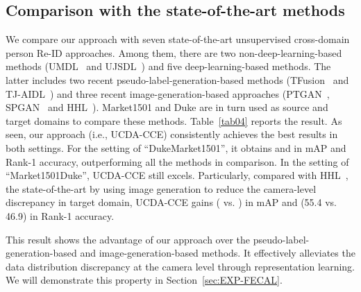 \documentclass[10pt,twocolumn,letterpaper]{article}
\begin{document}
 
\subsection{Comparison with the state-of-the-art methods}\label{sec:EXP-CSM}
We compare our approach with seven state-of-the-art unsupervised cross-domain person Re-ID approaches. Among them, there are two non-deep-learning-based methods (UMDL~\cite{DBLP:conf/cvpr/PengXWPGHT16} and UJSDL~\cite{qi2018unsupervised}) and five deep-learning-based methods. The latter includes two recent pseudo-label-generation-based methods (TFusion~\cite{lv2018unsupervised} and TJ-AIDL~\cite{wang2018transferable}) and three recent image-generation-based approaches (PTGAN~\cite{wei2018person}, SPGAN~\cite{deng2018image} and HHL~\cite{zhong2018generalizing}). Market1501 and Duke are in turn used as source and target domains to compare these methods. Table~\ref{tab04} reports the result. As seen, our approach (i.e., UCDA-CCE) consistently achieves the best results in both settings. For the setting of ``DukeMarket1501'', it obtains  and  in mAP and Rank-1 accuracy, outperforming all the methods in comparison. In the setting of ``Market1501Duke'', UCDA-CCE still excels. Particularly, compared with HHL~\cite{zhong2018generalizing}, the state-of-the-art by using image generation to reduce the camera-level discrepancy in target domain, UCDA-CCE gains  ( vs. ) in mAP and  (55.4 vs. 46.9) in Rank-1 accuracy. 
 
This result shows the advantage of our approach over the pseudo-label-generation-based and image-generation-based methods. It effectively alleviates the data distribution discrepancy at the camera level through representation learning. We will demonstrate this property in Section~\ref{sec:EXP-FECAL}.
 
\end{document}
